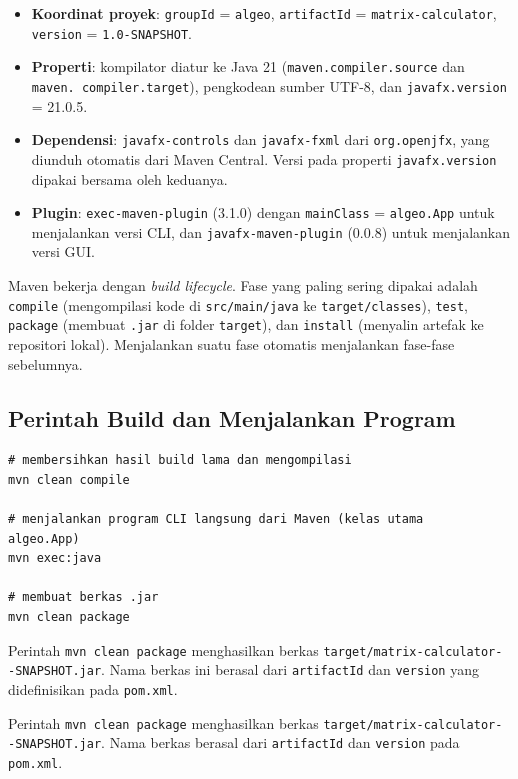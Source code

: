 \documentclass[12pt,a4paper]{report}
\begin{document}
\begin{itemize}
  \item \textbf{Koordinat proyek}: \texttt{groupId} = \texttt{algeo},
    \texttt{artifactId} = \texttt{matrix-calculator}, \texttt{version} =
    \texttt{1.0-SNAPSHOT}.
  \item \textbf{Properti}: kompilator diatur ke Java 21
    (\texttt{maven.compiler.source} dan \texttt{maven. \newline compiler.target}),
    pengkodean sumber UTF-8, dan \texttt{javafx.version} = 21.0.5.
  \item \textbf{Dependensi}: \texttt{javafx-controls} dan \texttt{javafx-fxml}
    dari \texttt{org.openjfx}, yang diunduh otomatis dari Maven Central.
    Versi pada properti \texttt{javafx.version} dipakai bersama oleh keduanya.
  \item \textbf{Plugin}: \texttt{exec-maven-plugin} (3.1.0) dengan
    \texttt{mainClass} = \texttt{algeo.App} untuk menjalankan versi CLI, dan
    \texttt{javafx-maven-plugin} (0.0.8) untuk menjalankan versi GUI.
\end{itemize}

Maven bekerja dengan \textit{build lifecycle}. Fase yang paling sering dipakai
adalah \texttt{compile} (mengompilasi kode di \texttt{src/main/java} ke
\texttt{target/classes}), \texttt{test}, \texttt{package} (membuat \texttt{.jar}
di folder \texttt{target}), dan \texttt{install} (menyalin artefak ke repositori
lokal). Menjalankan suatu fase otomatis menjalankan fase-fase sebelumnya.

\subsection{Perintah Build dan Menjalankan Program}

\begin{verbatim}
# membersihkan hasil build lama dan mengompilasi
mvn clean compile

# menjalankan program CLI langsung dari Maven (kelas utama 
algeo.App)
mvn exec:java

# membuat berkas .jar
mvn clean package
\end{verbatim}

Perintah \texttt{mvn clean package} menghasilkan berkas \texttt{target/matrix-calculator- -SNAPSHOT.jar}. Nama berkas ini berasal dari \texttt{artifactId} dan \texttt{version} yang didefinisikan pada \texttt{pom.xml}.

Perintah \texttt{mvn clean package} menghasilkan berkas
\texttt{target/matrix-calculator- -SNAPSHOT.jar}. Nama berkas berasal dari
\texttt{artifactId} dan \texttt{version} pada \texttt{pom.xml}.
\end{document}
